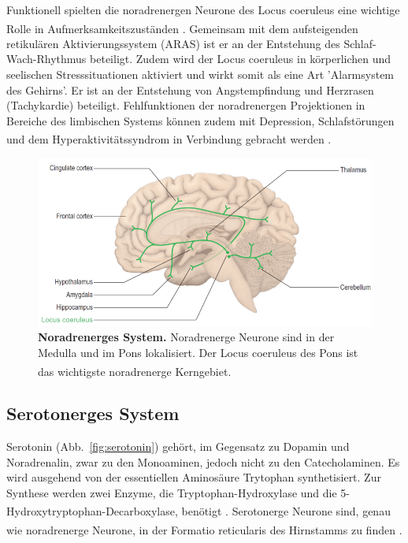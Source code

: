 \documentclass[12pt,a4paper,pdftex]{article}
\begin{document}
Funktionell spielten die noradrenergen Neurone des Locus coeruleus eine wichtige Rolle in Aufmerksamkeitszuständen \textsuperscript{\cite[46]{kandel2013principles}}. Gemeinsam mit dem aufsteigenden retikulären Aktivierungssystem (ARAS) ist er an der Entstehung des Schlaf-Wach-Rhythmus beteiligt. Zudem wird der Locus coeruleus in körperlichen und seelischen Stresssituationen aktiviert und wirkt somit als eine Art 'Alarmsystem des Gehirns'. Er ist an der Entstehung von Angstempfindung und Herzrasen (Tachykardie) beteiligt. Fehlfunktionen der noradrenergen Projektionen in Bereiche des limbischen Systems können zudem mit Depression, Schlafstörungen und dem Hyperaktivitätssyndrom in Verbindung gebracht werden \textsuperscript{\cite[6]{trepel2011neuroanatomie}}.

\begin{figure}[H]
    \centering
    \includegraphics[width=\textwidth]{pictures/Bilder_monoamine_systeme/noradrenerges_system.PNG}
    \caption[Noradrenerges System]{\textbf{Noradrenerges System.} Noradrenerge Neurone sind in der Medulla und im Pons lokalisiert. Der Locus coeruleus des Pons ist das wichtigste noradrenerge Kerngebiet. \textsuperscript{\cite[9]{crossman2014neuroanatomy}}}
    \label{fig:noradrenerges_system}
\end{figure}{}


\subsection{Serotonerges System}
\label{serotonerges_system}
Serotonin (Abb.~\ref{fig:serotonin}) gehört, im Gegensatz zu Dopamin und Noradrenalin, zwar zu den Monoaminen, jedoch nicht zu den Catecholaminen. Es wird ausgehend von der essentiellen Aminosäure Trytophan synthetisiert. Zur Synthese werden zwei Enzyme, die Tryptophan-Hydroxylase und die 5-Hydroxytryptophan-Decarboxylase, benötigt \textsuperscript{\cite[13]{kandel2013principles}}. Serotonerge Neurone sind, genau wie noradrenerge Neurone, in der Formatio reticularis des Hirnstamms zu finden \textsuperscript{\cite[7]{trepel2011neuroanatomie}}.
\end{document}

